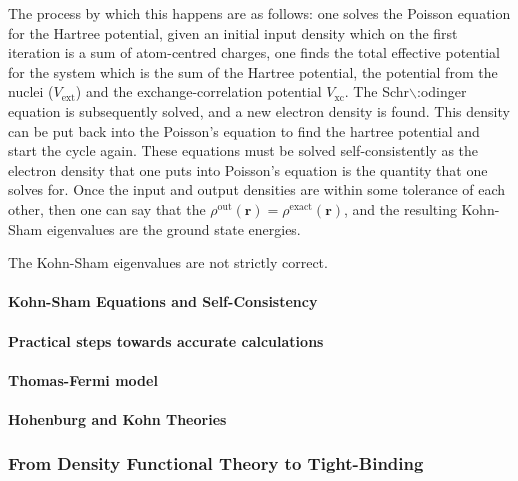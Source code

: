 \documentclass[a4paper,11pt]{article}
\numberwithin{equation}{chapter}
\numberwithin{listing}{chapter}
\begin{document}
The process by which this happens are as follows: one solves the Poisson
equation for the Hartree potential, given an initial input density which on
the first iteration is a sum of atom-centred charges, one finds the total
effective potential for the system which is the sum of the Hartree potential,
the potential from the nuclei (\(V_{\text{ext}}\)) and the exchange-correlation
potential \(V_{\text{xc}}\). The Schr$\backslash$:odinger equation is subsequently solved,
and a new electron density is found. This density can be put back into the
Poisson's equation to find the hartree potential and start the cycle
again. These equations must be solved self-consistently as the electron
density that one puts into Poisson's equation is the quantity that one solves
for. Once the input and output densities are within some tolerance of each
other, then one can say that the \(\rho^{\text{out}}(\mathbf{r}) =
\rho^{\text{exact}}(\mathbf{r})\), and the resulting Kohn-Sham eigenvalues are
the ground state energies.

The Kohn-Sham eigenvalues are not strictly correct. 


\paragraph{Kohn-Sham Equations and Self-Consistency}
\label{sec:org0599dbb}


\paragraph{Practical steps towards accurate calculations}
\label{sec:org07582ea}



\paragraph{Thomas-Fermi model}
\label{sec:org2d1a0e5}

\paragraph{Hohenburg and Kohn Theories}
\label{sec:orgcf68d25}




\subsubsection{From Density Functional Theory to Tight-Binding}
\label{sec:org0c4d771}
\end{document}

